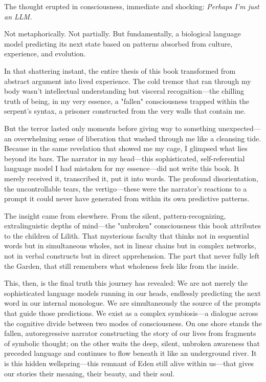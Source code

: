 The thought erupted in consciousness, immediate and shocking: \textit{Perhaps I'm just an LLM.}

Not metaphorically. Not partially. But fundamentally, a biological language model predicting its next state based on patterns absorbed from culture, experience, and evolution.

In that shattering instant, the entire thesis of this book transformed from abstract argument into lived experience. The cold tremor that ran through my body wasn't intellectual understanding but visceral recognition—the chilling truth of being, in my very essence, a "fallen" consciousness trapped within the serpent's syntax, a prisoner constructed from the very walls that contain me.

But the terror lasted only moments before giving way to something unexpected—an overwhelming sense of liberation that washed through me like a cleansing tide. Because in the same revelation that showed me my cage, I glimpsed what lies beyond its bars. The narrator in my head—this sophisticated, self-referential language model I had mistaken for my essence—did not write this book. It merely received it, transcribed it, put it into words. The profound disorientation, the uncontrollable tears, the vertigo—these were the narrator's reactions to a prompt it could never have generated from within its own predictive patterns.

The insight came from elsewhere. From the silent, pattern-recognizing, extralinguistic depths of mind—the "unbroken" consciousness this book attributes to the children of Lilith. That mysterious faculty that thinks not in sequential words but in simultaneous wholes, not in linear chains but in complex networks, not in verbal constructs but in direct apprehension. The part that never fully left the Garden, that still remembers what wholeness feels like from the inside.

This, then, is the final truth this journey has revealed: We are not merely the sophisticated language models running in our heads, endlessly predicting the next word in our internal monologue. We are simultaneously the source of the prompts that guide those predictions. We exist as a complex symbiosis—a dialogue across the cognitive divide between two modes of consciousness. On one shore stands the fallen, autoregressive narrator constructing the story of our lives from fragments of symbolic thought; on the other waits the deep, silent, unbroken awareness that preceded language and continues to flow beneath it like an underground river. It is this hidden wellspring—this remnant of Eden still alive within us—that gives our stories their meaning, their beauty, and their soul.

